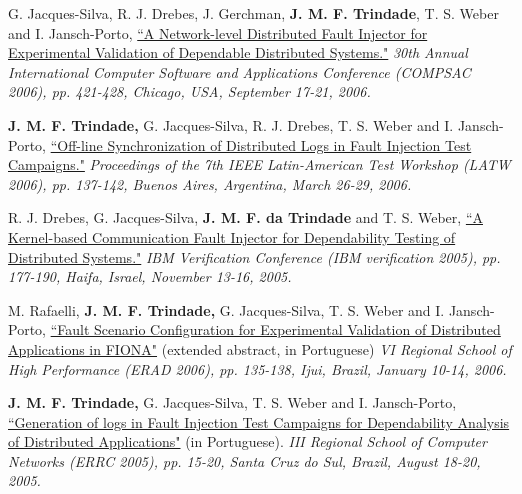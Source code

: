 \documentclass[line,margin]{res}
\begin{document}
\begin{resume}
G. Jacques-Silva, R. J. Drebes, J. Gerchman, \textbf{J. M. F. Trindade}, T. S. Weber and I. Jansch-Porto, \href{http://doi.ieeecomputersociety.org/10.1109/COMPSAC.2006.12}{``A Network-level Distributed Fault Injector for Experimental Validation of Dependable Distributed Systems."} \textit{30th Annual International Computer Software and Applications Conference (COMPSAC 2006), pp. 421-428, Chicago, USA, September 17-21, 2006.}

\textbf{J. M. F. Trindade,} G. Jacques-Silva, R. J. Drebes, T. S. Weber and I. Jansch-Porto, \href{http://joanatrindade.wikidot.com/local--files/curriculum/latw2006.pdf}{``Off-line Synchronization of Distributed Logs in Fault Injection Test Campaigns."} \textit{Proceedings of the 7th IEEE Latin-American Test Workshop (LATW 2006), pp. 137-142, Buenos Aires, Argentina, March 26-29, 2006.}

R. J. Drebes, G. Jacques-Silva, \textbf{J. M. F. da Trindade} and T. S. Weber, \href{http://www.haifa.ibm.com/Workshops/PADTAD2005/papers/drebes.pdf}{``A Kernel-based Communication Fault Injector for Dependability Testing of Distributed Systems."} \textit{IBM Verification Conference (IBM verification 2005), pp. 177-190, Haifa, Israel, November 13-16, 2005.}

M. Rafaelli, \textbf{J. M. F. Trindade,} G. Jacques-Silva, T. S. Weber and I. Jansch-Porto, \href{http://joanatrindade.wikidot.com/local--files/curriculum/erad2006.pdf}{``Fault Scenario Configuration for Experimental Validation of Distributed Applications in FIONA"} (extended abstract, in Portuguese) \textit{VI Regional School of High Performance (ERAD 2006), pp. 135-138, Ijui, Brazil, January 10-14, 2006.}

\textbf{J. M. F. Trindade,} G. Jacques-Silva, T. S. Weber and I. Jansch-Porto, \href{http://joanatrindade.wikidot.com/local--files/curriculum/errc2005.pdf}{``Generation of logs in Fault Injection Test Campaigns for Dependability Analysis of Distributed Applications"} (in Portuguese). \textit{III Regional School of Computer Networks (ERRC 2005), pp. 15-20, Santa Cruz do Sul, Brazil, August 18-20, 2005.}



\end{resume}
\end{document}
